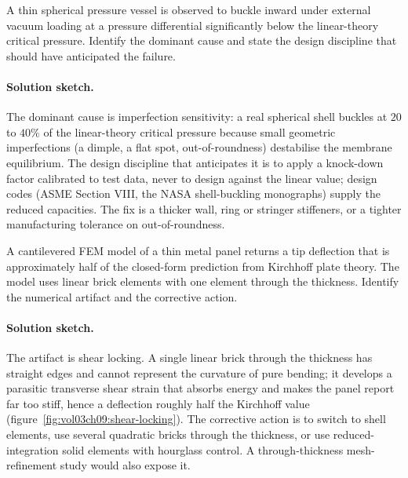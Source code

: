 \begin{exercise}
A thin spherical pressure vessel is observed to buckle inward
under external vacuum loading at a pressure differential
significantly below the linear-theory critical pressure. Identify
the dominant cause and state the design discipline that should
have anticipated the failure.

\paragraph{Solution sketch.} The dominant cause is imperfection
sensitivity: a real spherical shell buckles at $20$ to $40\%$ of the
linear-theory critical pressure because small geometric imperfections
(a dimple, a flat spot, out-of-roundness) destabilise the membrane
equilibrium. The design discipline that anticipates it is to apply a
knock-down factor calibrated to test data, never to design against the
linear value; design codes (ASME Section VIII, the NASA shell-buckling
monographs) supply the reduced capacities. The fix is a thicker wall,
ring or stringer stiffeners, or a tighter manufacturing tolerance on
out-of-roundness.
\end{exercise}

\begin{exercise}
A cantilevered FEM model of a thin metal panel returns a tip
deflection that is approximately half of the closed-form
prediction from Kirchhoff plate theory. The model uses linear
brick elements with one element through the thickness. Identify
the numerical artifact and the corrective action.

\paragraph{Solution sketch.} The artifact is shear locking. A single
linear brick through the thickness has straight edges and cannot
represent the curvature of pure bending; it develops a parasitic
transverse shear strain that absorbs energy and makes the panel report
far too stiff, hence a deflection roughly half the Kirchhoff value
(figure~\ref{fig:vol03ch09:shear-locking}). The corrective action is to
switch to shell elements, use several quadratic bricks through the
thickness, or use reduced-integration solid elements with hourglass
control. A through-thickness mesh-refinement study would also expose it.
\end{exercise}


